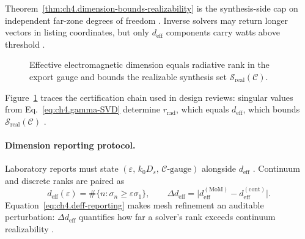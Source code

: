 Theorem~\ref{thm:ch4.dimension-bounds-realizability} is the synthesis-side cap on independent far-zone degrees of freedom \cite{devaney2004,collin2001}.
Inverse solvers may return longer vectors in listing coordinates, but only \(d_{\mathrm{eff}}\) components carry watts above threshold
\cite{harrington2001,hansen1988,stratton1941}.

\begin{figure}[t]
\centering
{}
\caption{Effective electromagnetic dimension equals radiative rank in the export gauge and bounds the realizable synthesis set
\(\mathcal{S}_{\mathrm{real}}(\mathcal{C})\).}
\label{fig:ch4.effective-em-dimension}
\end{figure}

Figure~\ref{fig:ch4.effective-em-dimension} traces the certification chain used in design reviews: singular values from
Eq.~\eqref{eq:ch4.gamma-SVD} determine \(r_{\mathrm{rad}}\), which equals \(d_{\mathrm{eff}}\), which bounds
\(\mathcal{S}_{\mathrm{real}}(\mathcal{C})\) \cite{hansen1988,harrington2001,devaney2004,jackson1999}.

\paragraph{Dimension reporting protocol.}
Laboratory reports must state \((\varepsilon,\,k_{0}D_{s},\,\mathcal{C}\text{-gauge})\) alongside \(d_{\mathrm{eff}}\)
\cite{hansen1988,stratton1941,harrington2001,collin2001}. Continuum and discrete ranks are paired as
\begin{equation}
\label{eq:ch4.deff-reporting}
d_{\mathrm{eff}}(\varepsilon)
=
\#\{n:\sigma_{n}\ge\varepsilon\sigma_{1}\},
\qquad
\Delta d_{\mathrm{eff}}
=
\big|d_{\mathrm{eff}}^{\mathrm{(MoM)}}-d_{\mathrm{eff}}^{\mathrm{(cont)}}\big|.
\end{equation}
Equation~\eqref{eq:ch4.deff-reporting} makes mesh refinement an auditable perturbation: \(\Delta d_{\mathrm{eff}}\) quantifies how far a
solver's rank exceeds continuum realizability \cite{harrington2001,devaney2004,hansen1988}.

